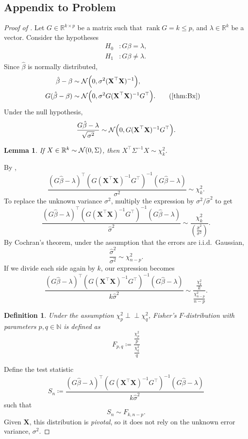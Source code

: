 \documentclass[letterpaper, reqno]{amsart}
\newtheorem{lemma}[theorem]{Lemma}
\newtheorem{definition}{Definition}[section]
\numberwithin{equation}{section}
\newcommand{\T}{\top} %
\newcommand{\vect}[1]{\boldsymbol{\mathbf{#1}}} %
\newcommand{\ddfrac}[2]{\frac{\displaystyle #1}{\displaystyle #2}}
\newcommand{\R}{\mathbb{R}}  %
\newcommand{\N}[2]{\mathcal{N}\mleft( #1, #2 \mright)}
\newcommand{\indep}{\perp \!\!\! \perp}  %
\newcommand{\iid}{i.i.d.}
\newcommand{\by}[1]{&\quad&\text{(#1)}}
\newcommand{\Xm}{\vect{X}}
\newcommand{\Bv}{\beta}
\newcommand{\Bvh}{\hat{\beta}}
\DeclareMathOperator{\rank}{rank}
\begin{document}
\subsection*{Appendix to Problem \thesection} \label{app:F_test}

\begin{proof}[Proof of ]
  Let $G \in \R^{k \times p}$ be a matrix such that $\rank G = k \le p$,
  and $\lambda \in \R^k$ be a vector. Consider the hypotheses
  \begin{align*}
    H_0 &\colon G\Bv = \lambda, \\
    H_1 &\colon G\Bv \ne \lambda.
  \end{align*}
  Since $\Bvh$ is normally distributed,
  \begin{alignat*}{3}
    \Bvh - \Bv &\sim \N{0}{\sigma^2 (\Xm^\T \Xm)^{-1}}, \\
    G(\Bvh - \Bv) &\sim \N{0}{\sigma^2 G (\Xm^\T \Xm)^{-1} G^\T}. \by{\Cref{thm:Bx}}
  \end{alignat*}
  Under the null hypothesis,
  \[ \frac{G\Bvh - \lambda}{\sqrt{\sigma^2}} \sim \N{0}{G (\Xm^\T \Xm)^{-1} G^\T}. \]

  \begin{lemma} \label{lem:norm2chi}
    If $X \in \R^k \sim \N{0}{\Sigma}$, then $X^\T \Sigma^{-1} X \sim \chi^2_k$.
  \end{lemma}

  By ,
  \[ \frac{(G\Bvh - \lambda)^\T (G (\Xm^\T \Xm)^{-1} G^\T)^{-1} (G\Bvh - \lambda)}{\sigma^2} 
    \sim \chi^2_k. \]
  To replace the unknown variance $\sigma^2$, multiply the expression by 
  $\sigma^2/\hat{\sigma}^2$ to get
  \[ \frac{(G\Bvh - \lambda)^\T (G (\Xm^\T \Xm)^{-1} G^\T)^{-1} (G\Bvh - \lambda)}{\hat{\sigma}^2} 
    \sim \ddfrac{\chi^2_k}{\left(\frac{\hat{\sigma}^2}{\sigma^2}\right)}. \]
  By Cochran's theorem, under the assumption that the errors are \iid\ Gaussian,
  \[ \frac{\hat{\sigma}^2}{\sigma^2} \sim \chi^2_{n-p}. \]
  If we divide each side again by $k$, our expression becomes
  \[ \frac{(G\Bvh - \lambda)^\T (G (\Xm^\T \Xm)^{-1} G^\T)^{-1} (G\Bvh - \lambda)}{k \hat{\sigma}^2} 
    \sim \ddfrac{\frac{\chi^2_k}{k}}{\frac{\chi^2_{n-p}}{n-p}}. \]
  \begin{definition} 
    Under the assumption $\chi^2_p \indep \chi^2_q$, Fisher's $F$-distribution
    with parameters $p, q \in \mathbb{N}$ is defined as
    \[ F_{p, q} \coloneqq \ddfrac{\frac{\chi^2_p}{p}}{\frac{\chi^2_q}{q}} \]
  \end{definition}
  Define the test statistic
  \[ S_n \coloneqq \frac{(G\Bvh - \lambda)^\T (G (\Xm^\T \Xm)^{-1} G^\T)^{-1} (G\Bvh - \lambda)}
    {k \hat{\sigma}^2} \]
  such that
  \[ S_n \sim F_{k, n-p}. \]
  Given $\Xm$, this distribution is \emph{pivotal}, so it does not rely on the
  unknown error variance, $\sigma^2$.
\end{proof}
\end{document}
